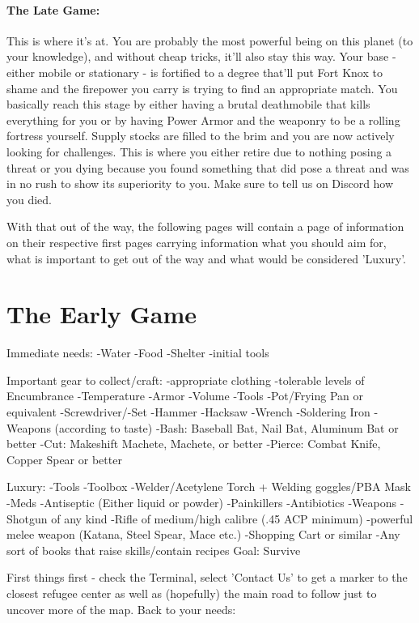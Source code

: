 \documentclass[11pt]{report}
\begin{document}
\paragraph{The Late Game:}
This is where it's at. You are probably the most powerful being on this planet (to your knowledge), and without cheap tricks, it'll also stay this way. Your base - either mobile or stationary - is fortified to a degree that'll put Fort Knox to shame and the firepower you carry is trying to find an appropriate match. You basically reach this stage by either having a brutal deathmobile that kills everything for you or by having Power Armor and the weaponry to be a rolling fortress yourself. Supply stocks are filled to the brim and you are now actively looking for challenges. This is where you either retire due to nothing posing a threat or you dying because you found something that did pose a threat and was in no rush to show its superiority to you. Make sure to tell us on Discord how you died.

With that out of the way, the following pages will contain a page of information on their respective first pages carrying information what you should aim for, what is important to get out of the way and what would be considered 'Luxury'.

\section{The Early Game}
Immediate needs:
-Water
-Food
-Shelter
-initial tools

Important gear to collect/craft:
-appropriate clothing
	-tolerable levels of Encumbrance
-Temperature
-Armor
-Volume
-Tools
	-Pot/Frying Pan or equivalent
-Screwdriver/-Set
-Hammer
-Hacksaw
-Wrench
-Soldering Iron
-Weapons (according to taste)
	-Bash: Baseball Bat, Nail Bat, Aluminum Bat or better
	-Cut: Makeshift Machete, Machete, or better
	-Pierce: Combat Knife, Copper Spear or better

Luxury:
-Tools
	-Toolbox
	-Welder/Acetylene Torch + Welding goggles/PBA Mask
-Meds
	-Antiseptic (Either liquid or powder)
	-Painkillers
	-Antibiotics
-Weapons
	-Shotgun of any kind
	-Rifle of medium/high calibre (.45 ACP minimum)
	-powerful melee weapon (Katana, Steel Spear, Mace etc.)
-Shopping Cart or similar
-Any sort of books that raise skills/contain recipes
Goal: Survive

First things first - check the Terminal, select 'Contact Us' to get a marker to the closest refugee center as well as (hopefully) the main road to follow just to uncover more of the map. Back to your needs:
\end{document}
